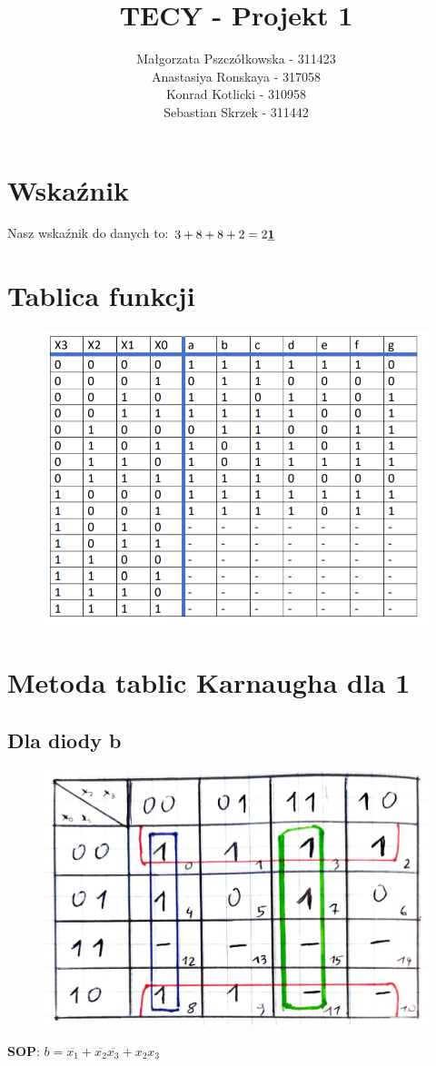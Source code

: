 \documentclass[]{article}
\title{TECY - Projekt 1}
\author{Małgorzata Pszczółkowska - 311423\\ Anastasiya Ronskaya - 317058 \\ Konrad Kotlicki - 310958 \\Sebastian Skrzek - 311442}
\begin{document}
\maketitle
\tableofcontents
\section{Wskaźnik}
Nasz wskaźnik do danych to:
$3+8+8+2=2\textbf{\underline{1}}$
\section{Tablica funkcji}
\begin{figure}[H]
	\centering
	\includegraphics[width=1\textwidth]{TablicaFunkcji.png}
\end{figure}
\section{Metoda tablic Karnaugha dla 1}
\subsection{Dla diody b}
\begin{figure}[H]
	\centering
	\includegraphics[width=1\textwidth]{minimalizacja_b.jpg}
\end{figure}
\textbf{SOP}: $b =\overline{x_{1}}+\overline{x_{2}}\overline{x_{3}}+x_{2}x_{3}$
\end{document}
